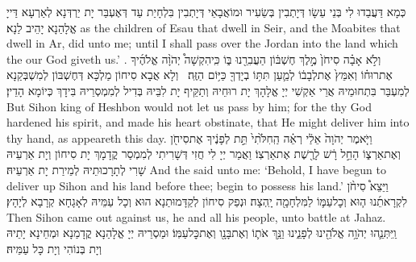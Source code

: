 {כְּמָא דַּעֲבַדוּ לִי בְּנֵי עֵשָׂו דְּיָתְבִין בְּשֵׂעִיר וּמוֹאֲבָאֵי דְּיָתְבִין בִּלְחָיַת עַד דְּאֶעְבַּר יָת יַרְדְּנָא לְאַרְעָא דַּייָ אֱלָהַנָא יָהֵיב לַנָא׃}
{as the children of Esau that dwell in Seir, and the Moabites that dwell in Ar, did unto me; until I shall pass over the Jordan into the land which the \lord\space our God giveth us.’ .}{}
{וְלֹ֣א אָבָ֗ה סִיחֹן֙ מֶ֣לֶךְ חֶשְׁבּ֔וֹן הַעֲבִרֵ֖נוּ בּ֑וֹ כִּֽי\maqqaf הִקְשָׁה֩ יְהֹוָ֨ה אֱלֹהֶ֜יךָ אֶת\maqqaf רוּח֗וֹ וְאִמֵּץ֙ אֶת\maqqaf לְבָב֔וֹ לְמַ֛עַן תִּתּ֥וֹ בְיָדְךָ֖ כַּיּ֥וֹם הַזֶּֽה׃ \setuma }
{וְלָא אֲבָא סִיחוֹן מַלְכָּא דְּחֶשְׁבּוֹן לְמִשְׁבְּקַנָא לְמִעְבַּר בִּתְחוּמֵיהּ אֲרֵי אַקְשִׁי יְיָ אֱלָהָךְ יָת רוּחֵיהּ וְתַקֵּיף יָת לִבֵּיהּ בְּדִיל לְמִמְסְרֵיהּ בִּידָךְ כְּיוֹמָא הָדֵין׃}
{But Sihon king of Heshbon would not let us pass by him; for the \lord\space thy God hardened his spirit, and made his heart obstinate, that He might deliver him into thy hand, as appeareth this day.}{}
{וַיֹּ֤אמֶר יְהֹוָה֙ אֵלַ֔י רְאֵ֗ה הַֽחִלֹּ֙תִי֙ תֵּ֣ת לְפָנֶ֔יךָ אֶת\maqqaf סִיחֹ֖ן וְאֶת\maqqaf אַרְצ֑וֹ הָחֵ֣ל רָ֔שׁ לָרֶ֖שֶׁת אֶת\maqqaf אַרְצֽוֹ׃}
{וַאֲמַר יְיָ לִי חֲזִי דְּשָׁרִיתִי לְמִמְסַר קֳדָמָךְ יָת סִיחוֹן וְיָת אַרְעֵיהּ שָׁרִי לְתָרָכוּתֵיהּ לְמֵירַת יָת אַרְעֵיהּ׃}
{And the \lord\space said unto me: ‘Behold, I have begun to deliver up Sihon and his land before thee; begin to possess his land.’}{}
{וַיֵּצֵא֩ סִיחֹ֨ן לִקְרָאתֵ֜נוּ ה֧וּא וְכׇל\maqqaf עַמּ֛וֹ לַמִּלְחָמָ֖ה יָֽהְצָה׃}
{וּנְפַק סִיחוֹן לְקַדָּמוּתַנָא הוּא וְכָל עַמֵּיהּ לְאָגָחָא קְרָבָא לְיָהָץ׃}
{Then Sihon came out against us, he and all his people, unto battle at Jahaz.}{}
{וַֽיִּתְּנֵ֛הוּ יְהֹוָ֥ה אֱלֹהֵ֖ינוּ לְפָנֵ֑ינוּ וַנַּ֥ךְ אֹת֛וֹ וְאֶת\maqqaf בָּנָ֖ו וְאֶת\maqqaf כׇּל\maqqaf עַמּֽוֹ׃}
{וּמַסְרֵיהּ יְיָ אֱלָהַנָא קֳדָמַנָא וּמְחֵינָא יָתֵיהּ וְיָת בְּנוֹהִי וְיָת כָּל עַמֵּיהּ׃}
